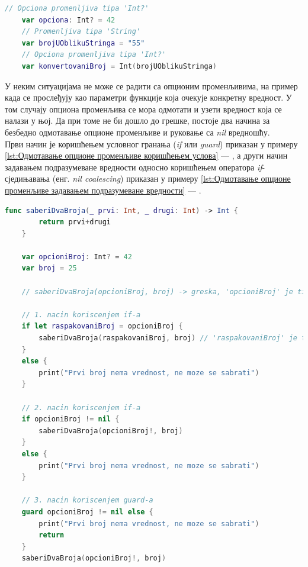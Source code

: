 \documentclass[12pt,oneside]{memoir}
\begin{document}
\begin{lstlisting}[caption=\textit{{Дефинисање опционе променљиве}}, label={lst:Дефинисање опционе променљиве}, language=Swift, frame=single]
    // Opciona promenljiva tipa 'Int?'
    var opciona: Int? = 42
    // Promenljiva tipa 'String'
    var brojUOblikuStringa = "55"
    // Opciona promenljiva tipa 'Int?'
    var konvertovaniBroj = Int(brojUOblikuStringa)
\end{lstlisting}

\indent У неким ситуацијама не може се радити са опционим променљивима, на пример када се прослеђују као параметри функције која очекује конкретну вредност. У том случају опциона променљива се мора одмотати и узети вредност која се налази у њој. Да при томе не би дошло до грешке, постоје два начина за безбедно одмотавање опционе променљиве и руковање са \textit{nil} вредношћу.
\\
\indent Први начин је коришћењем условног гранања (\textit{if} или \textit{guard}) приказан у примеру \ref{lst:Одмотавање опционе променљиве коришћењем услова} --- , а други начин задавањем подразумеване вредности односно коришћењем оператора \textit{if}-сједињавања (енг. \textit{nil coalescing}) приказан у примеру \ref{lst:Одмотавање опционе променљиве задавањем подразумеване вредности} --- .

\begin{lstlisting}[caption=\textit{{Одмотавање опционе променљиве коришћењем услова}}, label={lst:Одмотавање опционе променљиве коришћењем услова}, language=Swift, frame=single]
    func saberiDvaBroja(_ prvi: Int, _ drugi: Int) -> Int {
        return prvi+drugi
    }
    
    var opcioniBroj: Int? = 42
    var broj = 25
    
    // saberiDvaBroja(opcioniBroj, broj) -> greska, 'opcioniBroj' je tipa Int? dok funkcija ocekuje parametar tipa Int
    
    // 1. nacin koriscenjem if-a
    if let raspakovaniBroj = opcioniBroj {
        saberiDvaBroja(raspakovaniBroj, broj) // 'raspakovaniBroj' je tipa Int
    }
    else {
        print("Prvi broj nema vrednost, ne moze se sabrati")
    }
    
    // 2. nacin koriscenjem if-a
    if opcioniBroj != nil {
        saberiDvaBroja(opcioniBroj!, broj)
    }
    else {
        print("Prvi broj nema vrednost, ne moze se sabrati")
    }
    
    // 3. nacin koriscenjem guard-a
    guard opcioniBroj != nil else {
        print("Prvi broj nema vrednost, ne moze se sabrati")
        return
    }
    saberiDvaBroja(opcioniBroj!, broj)
\end{lstlisting}
\end{document}
